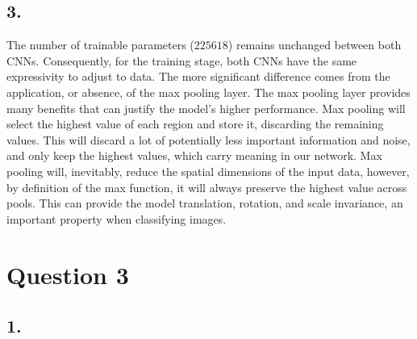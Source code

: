 \documentclass[11pt]{article}
\begin{document}
\subsection*{3.}

The number of trainable parameters ($225618$) remains unchanged between both CNNs. Consequently, for the training stage, both CNNs have the same expressivity to adjust to data. The more significant difference comes from the application, or absence, of the max pooling layer. The max pooling layer provides many benefits that can justify the model's higher performance. Max pooling will select the highest value of each region and store it, discarding the remaining values. This will discard a lot of potentially less important information and noise, and only keep the highest values, which carry meaning in our network. Max pooling will, inevitably, reduce the spatial dimensions of the input data, however, by definition of the max function, it will always preserve the highest value across pools. This can provide the model translation, rotation, and scale invariance, an important property when classifying images.

\section*{Question 3}

\subsection*{1.}
\end{document}
